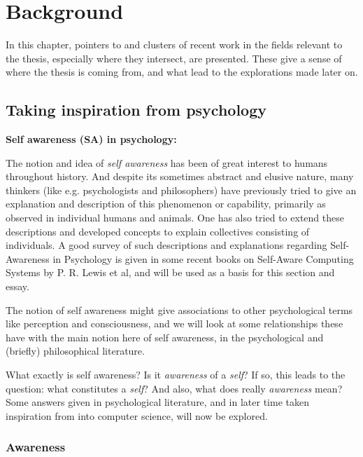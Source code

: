 \chapter{Background}
\label{chap:background}

In this chapter, pointers to and clusters of recent work in the fields relevant to the thesis, especially where they intersect, are presented. These give a sense of where the thesis is coming from, and what lead to the explorations made later on.


\section{Taking inspiration from psychology}
\label{sec:SA_foundation_and_basis}

\textbf{Self awareness (SA) in psychology:} \nl	

The notion and idea of \textit{self awareness} has been of great interest to humans throughout history. And despite its sometimes abstract and elusive nature, many thinkers (like e.g. psychologists and philosophers) have previously tried to give an explanation and description of this phenomenon or capability, primarily as observed in individual humans and animals. One has also tried to extend these descriptions and developed concepts to explain collectives consisting of individuals. A good survey of such descriptions and explanations regarding Self-Awareness in Psychology is given in some recent books on Self-Aware Computing Systems \cite{sacs16_ch2, sacs17_ch3} by P. R. Lewis et al, and will be used as a basis for this section and essay.

The notion of self awareness might give associations to other psychological terms like perception and consciousness, and we will look at some relationships these have with the main notion here of self awareness, in the psychological and (briefly) philosophical literature.
\newline

What exactly is self awareness? Is it \textit{awareness} of a \textit{self}? If so, this leads to the question: what constitutes a \textit{self}? And also, what does really \textit{awareness} mean? Some answers given in psychological literature, and in later time taken inspiration from into computer science, will now be explored.
\newline

	\subsection{Awareness}


